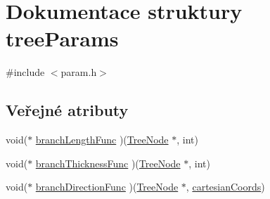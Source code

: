 \hypertarget{structtree_params}{
\section{Dokumentace struktury treeParams}
\label{structtree_params}
}


{\ttfamily \#include $<$param.h$>$}

\subsection*{Veřejné atributy}
\begin{DoxyCompactItemize}
\item 
void($\ast$ \hyperlink{structtree_params_a57a7108e06e4882c73abcad9c704edcf}{branchLengthFunc} )(\hyperlink{class_tree_node}{TreeNode} $\ast$, int)
\item 
void($\ast$ \hyperlink{structtree_params_a4e0c469f7d593e2ef180342e65a91e0c}{branchThicknessFunc} )(\hyperlink{class_tree_node}{TreeNode} $\ast$, int)
\item 
void($\ast$ \hyperlink{structtree_params_ad23e490eec602e6b1f9bf883a1eed1f4}{branchDirectionFunc} )(\hyperlink{class_tree_node}{TreeNode} $\ast$, \hyperlink{structcartesian_coords}{cartesianCoords})
\end{DoxyCompactItemize}



